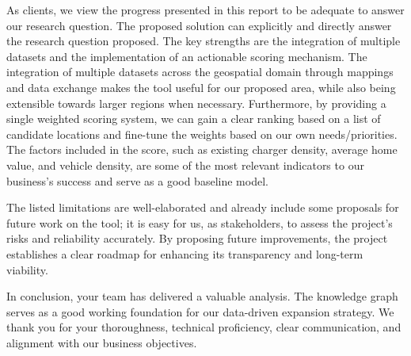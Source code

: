 \documentclass{article}
\begin{document}
As clients, we view the progress presented in this report to be adequate to answer our research question. The proposed solution can explicitly and directly answer the research question proposed. The key strengths are the integration of multiple datasets and the implementation of an actionable scoring mechanism. The integration of multiple datasets across the geospatial domain through mappings and data exchange makes the tool useful for our proposed area, while also being extensible towards larger regions when necessary. Furthermore, by providing a single weighted scoring system, we can gain a clear ranking based on a list of candidate locations and fine-tune the weights based on our own needs/priorities. The factors included in the score, such as existing charger density, average home value, and vehicle density, are some of the most relevant indicators to our business’s success and serve as a good baseline model.

The listed limitations are well-elaborated and already include some proposals for future work on the tool; it is easy for us, as stakeholders, to assess the project's risks and reliability accurately. By proposing future improvements, the project establishes a clear roadmap for enhancing its transparency and long-term viability.

In conclusion, your team has delivered a valuable analysis. The knowledge graph serves as a good working foundation for our data-driven expansion strategy. We thank you for your thoroughness, technical proficiency, clear communication, and alignment with our business objectives.
\end{document}

